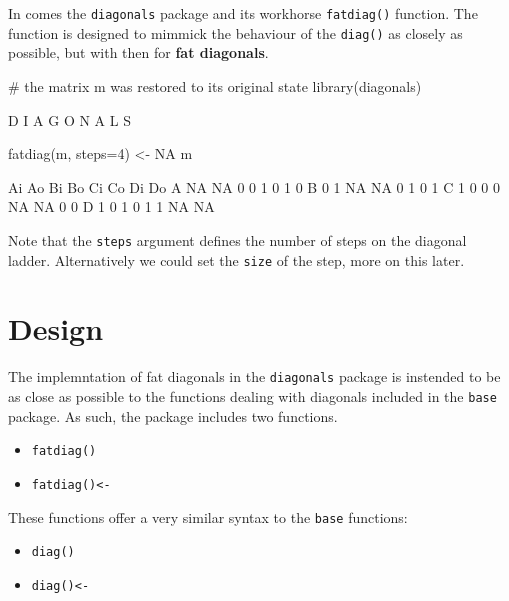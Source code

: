 \documentclass[article]{jss}
\begin{document}
In comes the \texttt{diagonals} package and its workhorse
\texttt{fatdiag()} function. The function is designed to mimmick the
behaviour of the \texttt{diag()} as closely as possible, but with then
for \textbf{fat diagonals}.

\begin{CodeChunk}
\begin{CodeInput}
# the matrix m was restored to its original state
library(diagonals)
\end{CodeInput}
\begin{CodeOutput}

D I
A G
    O N
    A L
        S
\end{CodeOutput}
\begin{CodeInput}
fatdiag(m, steps=4) <- NA
m
\end{CodeInput}
\begin{CodeOutput}
  Ai Ao Bi Bo Ci Co Di Do
A NA NA  0  0  1  0  1  0
B  0  1 NA NA  0  1  0  1
C  1  0  0  0 NA NA  0  0
D  1  0  1  0  1  1 NA NA
\end{CodeOutput}
\end{CodeChunk}

Note that the \texttt{steps} argument defines the number of steps on the
diagonal ladder. Alternatively we could set the \texttt{size} of the
step, more on this later.

\section{Design}\label{design}

The implemntation of fat diagonals in the \texttt{diagonals} package is
instended to be as close as possible to the functions dealing with
diagonals included in the \texttt{base} package. As such, the package
includes two functions.

\begin{itemize}
\itemsep1pt\parskip0pt
\item
  \texttt{fatdiag()}
\item
  \texttt{fatdiag()\textless{}-}
\end{itemize}

These functions offer a very similar syntax to the \texttt{base}
functions:

\begin{itemize}
\itemsep1pt\parskip0pt
\item
  \texttt{diag()}
\item
  \texttt{diag()\textless{}-}
\end{itemize}
\end{document}
